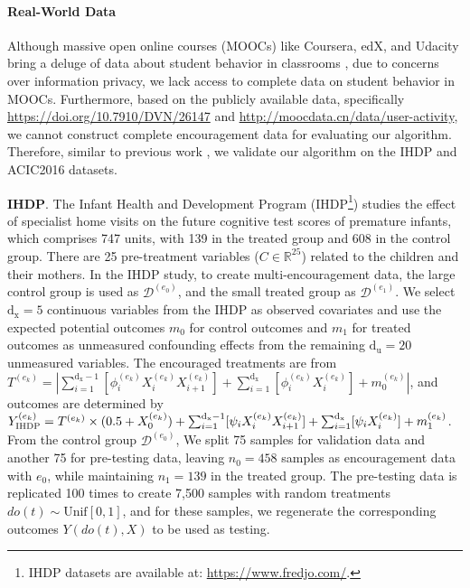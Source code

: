 \documentclass[journal]{IEEEtran}
\begin{document}
\paragraph{Real-World Data}
Although massive open online courses (MOOCs) like Coursera, edX, and Udacity bring a deluge of data about student behavior in classrooms \cite{breslow2013studying,kizilcec2014encouraging,reich2015rebooting}, due to concerns over information privacy, we lack access to complete data on student behavior in MOOCs. Furthermore, based on the publicly available data, specifically \url{https://doi.org/10.7910/DVN/26147} and \url{http://moocdata.cn/data/user-activity}, we cannot construct complete encouragement data for evaluating our algorithm. Therefore, similar to previous work \cite{shalit2017estimating,yao2021survey}, we validate our algorithm on the IHDP and ACIC2016 datasets.



\textbf{IHDP}. 
The Infant Health and Development Program (IHDP\footnote{IHDP datasets are available at: \url{https://www.fredjo.com/}.}) \cite{hill2011bayesian} studies the effect of specialist home visits on the future cognitive test scores of premature infants, which comprises 747 units, with 139 in the treated group and 608 in the control group.
There are 25 pre-treatment variables ($C \in \mathbb{R}^{25}$) related to the children and their mothers. In the IHDP study, to create multi-encouragement data, the large control group is used as $\mathcal{D}^{(e_0)}$, and the small treated group as $\mathcal{D}^{(e_1)}$. We select $\text{d}_\text{x} =5$ continuous variables from the IHDP as observed covariates and use the expected potential outcomes $m_0$ for control outcomes and $m_1$ for treated outcomes as unmeasured confounding effects from the remaining $\text{d}_\text{u} = 20$ unmeasured variables. The encouraged treatments are from $T^{(e_k)} = | \sum_{i=1}^{\text{d}_\text{x}-1} [\phi_i^{(e_k)}X_i^{(e_k)} X_{i+1}^{(e_k)}] + \sum_{i=1}^{\text{d}_\text{x}} [\phi_{i}^{(e_k)}X_{i}^{(e_k)}] + m_0^{(e_k)} |$, and outcomes are determined by $Y^{(e_k)}_{\textsc{IHDP}} = T^{(e_k)} \times (0.5+X_0^{(e_k)}) + \sum_{i=1}^{\text{d}_\text{x}-1} [\psi_i X_i^{(e_k)} X_{i+1}^{(e_k)}] + \sum_{i=1}^{\text{d}_\text{x}} [\psi_i X_{i}^{(e_k)}] + m_1^{(e_k)}$. From the control group $\mathcal{D}^{(e_0)}$, We split 75 samples for validation data and another 75 for pre-testing data, leaving $n_0 = \text{458}$ samples as encouragement data with $e_0$, while maintaining $n_1 = \text{139}$ in the treated group. The pre-testing data is replicated 100 times to create 7,500 samples with random treatments $do(t) \sim \text{Unif}[0, 1]$, and for these samples, we regenerate the corresponding outcomes $Y(do(t),X)$ to be used as testing.
\end{document}

